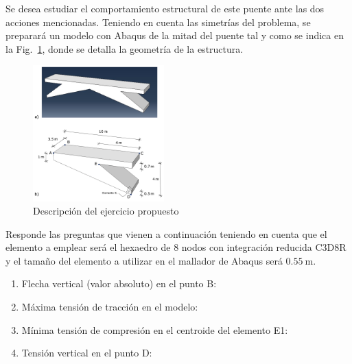 \documentclass[a4paper,12pt]{article}
\begin{document}
Se desea estudiar el comportamiento estructural de este puente ante las dos acciones mencionadas. Teniendo en cuenta las simetrías del problema, se preparará un modelo con Abaqus de la mitad del puente tal y como se indica en la Fig.~\ref{figuprop1}, donde se detalla la geometría de la estructura.

\begin{figure}[!h]
  \begin{center}
    \includegraphics[width=0.45\textwidth]{./figs/prop}
  \end{center}
  \caption{Descripción del ejercicio propuesto}
  \label{figuprop1}
\end{figure}

Responde las preguntas que vienen a continuación teniendo en cuenta que el elemento a emplear será el hexaedro de 8 nodos con integración reducida C3D8R y el tamaño del elemento a utilizar en el mallador de Abaqus será $0.55 \mathrm{~m}$.

\begin{enumerate}
\item Flecha vertical (valor absoluto) en el punto B:
  \begin{multicols}{4}
\columnbreak
{}
\columnbreak
{} %
\columnbreak
{}
  \end{multicols}

\item M\'axima tensi\'on de tracci\'on en el modelo:
  \begin{multicols}{4}
\columnbreak
{} 
\columnbreak
{}%
\columnbreak
{}
\end{multicols}

\item M\'inima tensi\'on de compresi\'on en el centroide del elemento E1:
  \begin{multicols}{4}
\columnbreak
{} 
\columnbreak
{}%
\columnbreak
{}
\end{multicols}
\item Tensi\'on vertical en el punto D:
  \begin{multicols}{4}
\columnbreak
{} 
\columnbreak
{}
\columnbreak
{}
\end{multicols}
\end{enumerate}
\end{document}
